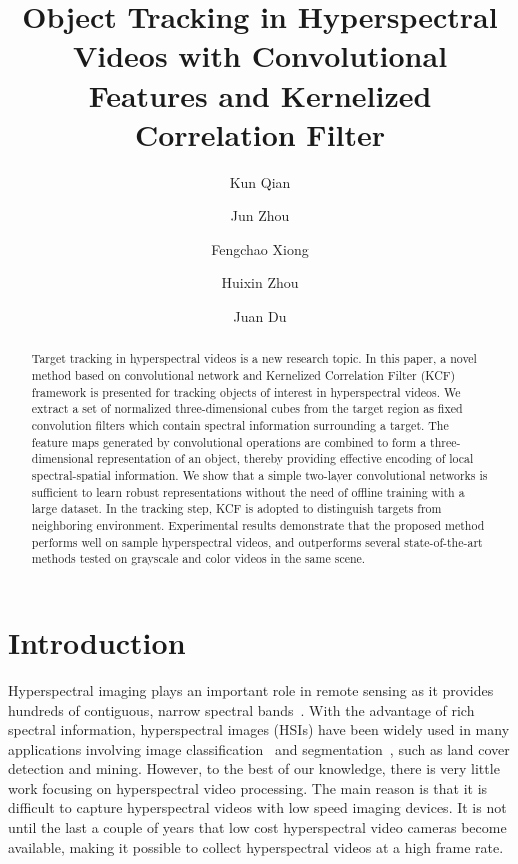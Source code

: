 \documentclass[runningheads,a4paper]{llncs}
\begin{document}
\title{Object Tracking in Hyperspectral Videos with Convolutional Features and Kernelized Correlation Filter}
\author{Kun Qian \and Jun Zhou \and Fengchao Xiong \and Huixin Zhou \and Juan Du}

\maketitle              %
\begin{abstract}
Target tracking in hyperspectral videos is a new research topic. In this paper, a novel method based on convolutional network and Kernelized Correlation Filter (KCF) framework is presented for tracking objects of interest in hyperspectral videos. We extract a set of normalized three-dimensional cubes from the target region as fixed convolution filters which contain spectral information surrounding a target. The feature maps generated by convolutional operations are combined to form a three-dimensional representation of an object, thereby providing effective encoding of local spectral-spatial information. We show that a simple two-layer convolutional networks is sufficient to learn robust representations without the need of offline training with a large dataset. In the tracking step, KCF is adopted to distinguish targets from neighboring environment. Experimental results demonstrate that the proposed method performs well on sample hyperspectral videos, and outperforms several state-of-the-art methods tested on grayscale and color videos in the same scene.

\end{abstract}
\section{Introduction}

Hyperspectral imaging plays an important role in remote sensing as it provides hundreds of contiguous, narrow spectral bands~\cite{HSI}. With the advantage of rich spectral information, hyperspectral images (HSIs) have been widely used in many applications involving image classification~\cite{a1} and segmentation~\cite{a2}, such as land cover detection and mining. However, to the best of our knowledge, there is very little work focusing on hyperspectral video processing. The main reason is that it is difficult to capture hyperspectral videos with low speed imaging devices. It is not until the last a couple of years that low cost hyperspectral video cameras become available, making it possible to collect hyperspectral videos at a high frame rate.
\end{document}
